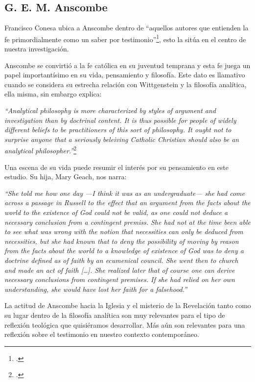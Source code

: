 \documentclass[../main.tex]{subfiles}
\begin{document}
\subsection{G. E. M. Anscombe}

Francisco Conesa ubica a Anscombe dentro de ``aquellos autores que entienden la fe primordialmente como un saber por testimonio''\footcite[84]{cyc}, esto la sitúa en el centro de nuestra investigación. 

Anscombe se convirtió a la fe católica en su juventud temprana y esta fe juega un papel importantísimo en su vida, pensamiento y filosofía. Este dato es llamativo cuando se considera su estrecha relación con Wittgenstein y la filosofía analítica, ella misma, sin embargo explica:

\emph{
``Analytical philosophy is more characterized by styles of argument and investigation than by doctrinal content. It is thus possible for people of widely different beliefs to be practitioners of this sort of philosophy. It ought not to surprise anyone that a seriously beleiving Catholic Christian should also be an analytical philosopher.''}\footcite[66]{opinionsanscombe}

Una escena de su vida puede resumir el interés por su pensamiento en este estudio. Su hija, Mary Geach, nos narra:

\emph{
``She told me how one day ---I think it was as an undergraduate--- she had come across a passage in Russell to the effect that an argument from the facts about the world to the existence of God could not be valid, as one could not deduce a necessary conclusion from a contingent premiss. She had not at the time been able to see what was wrong with the notion that necessities can only be deduced from necessities, but she had known that to deny the possibility of moving by reason from the facts about the world to a knowledge of existence of God was to deny a doctrine defined as of faith by an ecumenical council. She went then to church and made an act of faith [\ldots]. She realized later that of course one can derive necessary conclusions from contingent premises. If she had relied on her own understanding, she would have lost her faith for a falsehood.''}

La actitud de Anscombe hacia la Iglesia y el misterio de la Revelación tanto como su lugar dentro de la filosofía analítica son muy relevantes para el tipo de reflexión teológica que quisiéramos desarrollar. Más aún son relevantes para una reflexión sobre el testimonio en nuestro contexto contemporáneo.
\end{document}
